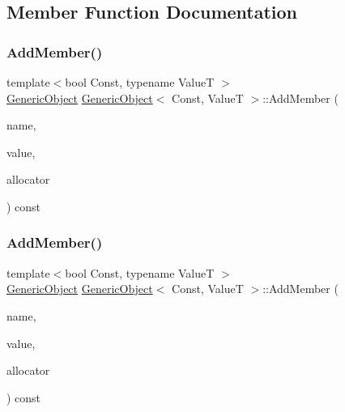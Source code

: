 \subsection{Member Function Documentation}
\mbox{\label{classGenericObject_a3668524c8566c46cbae97d938064f5fa}} 
\subsubsection{\texorpdfstring{Add\+Member()}{AddMember()}\hspace{0.1cm}{\footnotesize\ttfamily [1/4]}}
{\footnotesize\ttfamily template$<$bool Const, typename ValueT $>$ \\
\hyperlink{classGenericObject}{Generic\+Object} \hyperlink{classGenericObject}{Generic\+Object}$<$ Const, ValueT $>$\+::Add\+Member (\begin{DoxyParamCaption}\item[{\hyperlink{classGenericObject_a930aa30f89caee7ba7bff60bf9dc21b1}{Value\+Type} \&}]{name,  }\item[{\hyperlink{classGenericObject_a930aa30f89caee7ba7bff60bf9dc21b1}{Value\+Type} \&}]{value,  }\item[{\hyperlink{classGenericObject_a00c8cee952d5ebadc5e1c309aa489ad9}{Allocator\+Type} \&}]{allocator }\end{DoxyParamCaption}) const\hspace{0.3cm}{\ttfamily [inline]}}

\mbox{\label{classGenericObject_ae871adc8c906a72878b7cf5df279ed1f}} 
\subsubsection{\texorpdfstring{Add\+Member()}{AddMember()}\hspace{0.1cm}{\footnotesize\ttfamily [2/4]}}
{\footnotesize\ttfamily template$<$bool Const, typename ValueT $>$ \\
\hyperlink{classGenericObject}{Generic\+Object} \hyperlink{classGenericObject}{Generic\+Object}$<$ Const, ValueT $>$\+::Add\+Member (\begin{DoxyParamCaption}\item[{\hyperlink{classGenericObject_a930aa30f89caee7ba7bff60bf9dc21b1}{Value\+Type} \&}]{name,  }\item[{\hyperlink{classGenericObject_a9b8381fc96f5f89b2163b052ed66cc59}{String\+Ref\+Type}}]{value,  }\item[{\hyperlink{classGenericObject_a00c8cee952d5ebadc5e1c309aa489ad9}{Allocator\+Type} \&}]{allocator }\end{DoxyParamCaption}) const\hspace{0.3cm}{\ttfamily [inline]}}

